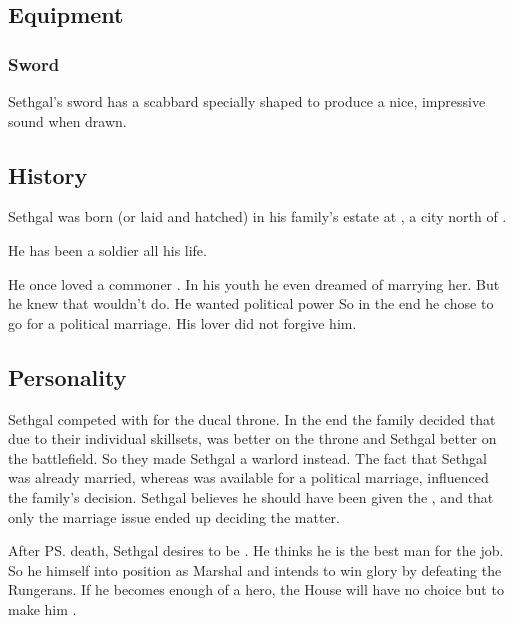 \subsection{Equipment}





\subsubsection{Sword}
Sethgal's sword has a scabbard specially shaped to produce a nice, impressive  sound when drawn.









\subsection{History}
Sethgal was born (or laid and hatched) in his family's estate at , a city north of \Malcur. 

He has been a soldier all his life. 

He once loved a commoner \sphyle{}. 
In his youth he even dreamed of marrying her. 
But he knew that wouldn't do. 
He wanted political power
So in the end he chose to go for a political marriage. 
His lover did not forgive him. 









\subsection{Personality}
Sethgal competed with \Icor{} for the ducal throne. 
In the end the family decided that due to their individual skillsets, \Icor{} was better on the throne and Sethgal better on the battlefield. 
So they made Sethgal a warlord instead. 
The fact that Sethgal was already married, whereas \Icor{} was available for a political marriage, influenced the family's decision.
Sethgal believes he should have been given the \rayuthship, and that only the marriage issue ended up deciding the matter. 

After \ps{\Icor} death, Sethgal desires to be \rayuth. 
He thinks he is the best man for the job. 
So he \manoeuvres himself into position as Marshal and intends to win glory by defeating the Rungerans. 
If he becomes enough of a hero, the House will have no choice but to make him \rayuth. 

